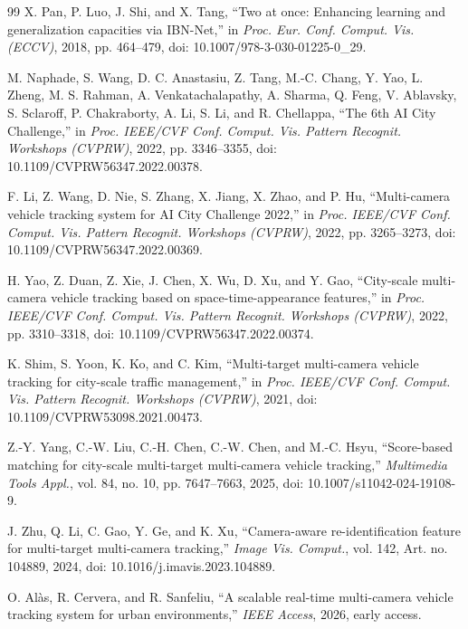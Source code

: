 \documentclass{ieeeaccess}
\begin{document}
\begin{thebibliography}{99}
X. Pan, P. Luo, J. Shi, and X. Tang, ``Two at once: Enhancing learning and generalization capacities via IBN-Net,'' in \emph{Proc. Eur. Conf. Comput. Vis. (ECCV)}, 2018, pp. 464--479, doi: 10.1007/978-3-030-01225-0\_29.

M. Naphade, S. Wang, D. C. Anastasiu, Z. Tang, M.-C. Chang, Y. Yao, L. Zheng, M. S. Rahman, A. Venkatachalapathy, A. Sharma, Q. Feng, V. Ablavsky, S. Sclaroff, P. Chakraborty, A. Li, S. Li, and R. Chellappa, ``The 6th AI City Challenge,'' in \emph{Proc. IEEE/CVF Conf. Comput. Vis. Pattern Recognit. Workshops (CVPRW)}, 2022, pp. 3346--3355, doi: 10.1109/CVPRW56347.2022.00378.

F. Li, Z. Wang, D. Nie, S. Zhang, X. Jiang, X. Zhao, and P. Hu, ``Multi-camera vehicle tracking system for AI City Challenge 2022,'' in \emph{Proc. IEEE/CVF Conf. Comput. Vis. Pattern Recognit. Workshops (CVPRW)}, 2022, pp. 3265--3273, doi: 10.1109/CVPRW56347.2022.00369.

H. Yao, Z. Duan, Z. Xie, J. Chen, X. Wu, D. Xu, and Y. Gao, ``City-scale multi-camera vehicle tracking based on space-time-appearance features,'' in \emph{Proc. IEEE/CVF Conf. Comput. Vis. Pattern Recognit. Workshops (CVPRW)}, 2022, pp. 3310--3318, doi: 10.1109/CVPRW56347.2022.00374.

K. Shim, S. Yoon, K. Ko, and C. Kim, ``Multi-target multi-camera vehicle tracking for city-scale traffic management,'' in \emph{Proc. IEEE/CVF Conf. Comput. Vis. Pattern Recognit. Workshops (CVPRW)}, 2021, doi: 10.1109/CVPRW53098.2021.00473.

Z.-Y. Yang, C.-W. Liu, C.-H. Chen, C.-W. Chen, and M.-C. Hsyu, ``Score-based matching for city-scale multi-target multi-camera vehicle tracking,'' \emph{Multimedia Tools Appl.}, vol. 84, no. 10, pp. 7647--7663, 2025, doi: 10.1007/s11042-024-19108-9.

J. Zhu, Q. Li, C. Gao, Y. Ge, and K. Xu, ``Camera-aware re-identification feature for multi-target multi-camera tracking,'' \emph{Image Vis. Comput.}, vol. 142, Art. no. 104889, 2024, doi: 10.1016/j.imavis.2023.104889.

O. Al\`as, R. Cervera, and R. Sanfeliu, ``A scalable real-time multi-camera vehicle tracking system for urban environments,'' \emph{IEEE Access}, 2026, early access.

\end{thebibliography}
\end{document}
